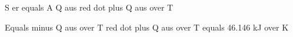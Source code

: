 S er equals A Q aus red dot plus Q aus over T

Equals minus Q aus over T red dot plus Q aus over T equals 46.146 kJ over K